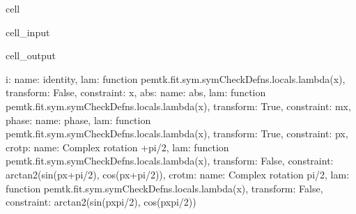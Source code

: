 \documentclass[letterpaper,table,10pt,english]{jupyterBook}
\begin{document}
\begin{sphinxuseclass}{cell}\begin{sphinxVerbatimInput}

\begin{sphinxuseclass}{cell_input}
\begin{sphinxVerbatim}[commandchars=\\\{\}]
   

\end{sphinxVerbatim}

\end{sphinxuseclass}\end{sphinxVerbatimInput}
\begin{sphinxVerbatimOutput}

\begin{sphinxuseclass}{cell_output}
\begin{sphinxVerbatim}[commandchars=\\\{\}]
\PYGZob{}\PYGZsq{}i\PYGZsq{}: \PYGZob{}\PYGZsq{}name\PYGZsq{}: \PYGZsq{}identity\PYGZsq{},
  \PYGZsq{}lam\PYGZsq{}: \PYGZlt{}function pemtk.fit.\PYGZus{}sym.symCheckDefns.\PYGZlt{}locals\PYGZgt{}.\PYGZlt{}lambda\PYGZgt{}(x)\PYGZgt{},
  \PYGZsq{}transform\PYGZsq{}: False,
  \PYGZsq{}constraint\PYGZsq{}: \PYGZsq{}x\PYGZsq{}\PYGZcb{},
 \PYGZsq{}abs\PYGZsq{}: \PYGZob{}\PYGZsq{}name\PYGZsq{}: \PYGZsq{}abs\PYGZsq{},
  \PYGZsq{}lam\PYGZsq{}: \PYGZlt{}function pemtk.fit.\PYGZus{}sym.symCheckDefns.\PYGZlt{}locals\PYGZgt{}.\PYGZlt{}lambda\PYGZgt{}(x)\PYGZgt{},
  \PYGZsq{}transform\PYGZsq{}: True,
  \PYGZsq{}constraint\PYGZsq{}: \PYGZsq{}m\PYGZus{}x\PYGZsq{}\PYGZcb{},
 \PYGZsq{}phase\PYGZsq{}: \PYGZob{}\PYGZsq{}name\PYGZsq{}: \PYGZsq{}phase\PYGZsq{},
  \PYGZsq{}lam\PYGZsq{}: \PYGZlt{}function pemtk.fit.\PYGZus{}sym.symCheckDefns.\PYGZlt{}locals\PYGZgt{}.\PYGZlt{}lambda\PYGZgt{}(x)\PYGZgt{},
  \PYGZsq{}transform\PYGZsq{}: True,
  \PYGZsq{}constraint\PYGZsq{}: \PYGZsq{}p\PYGZus{}x\PYGZsq{}\PYGZcb{},
 \PYGZsq{}crot\PYGZus{}p\PYGZsq{}: \PYGZob{}\PYGZsq{}name\PYGZsq{}: \PYGZsq{}Complex rotation +pi/2\PYGZsq{},
  \PYGZsq{}lam\PYGZsq{}: \PYGZlt{}function pemtk.fit.\PYGZus{}sym.symCheckDefns.\PYGZlt{}locals\PYGZgt{}.\PYGZlt{}lambda\PYGZgt{}(x)\PYGZgt{},
  \PYGZsq{}transform\PYGZsq{}: False,
  \PYGZsq{}constraint\PYGZsq{}: \PYGZsq{}arctan2(sin(p\PYGZus{}x+pi/2), cos(p\PYGZus{}x+pi/2))\PYGZsq{}\PYGZcb{},
 \PYGZsq{}crot\PYGZus{}m\PYGZsq{}: \PYGZob{}\PYGZsq{}name\PYGZsq{}: \PYGZsq{}Complex rotation \PYGZhy{}pi/2\PYGZsq{},
  \PYGZsq{}lam\PYGZsq{}: \PYGZlt{}function pemtk.fit.\PYGZus{}sym.symCheckDefns.\PYGZlt{}locals\PYGZgt{}.\PYGZlt{}lambda\PYGZgt{}(x)\PYGZgt{},
  \PYGZsq{}transform\PYGZsq{}: False,
  \PYGZsq{}constraint\PYGZsq{}: \PYGZsq{}arctan2(sin(p\PYGZus{}x\PYGZhy{}pi/2), cos(p\PYGZus{}x\PYGZhy{}pi/2))\PYGZsq{}\PYGZcb{}\PYGZcb{}
\end{sphinxVerbatim}


\end{sphinxuseclass}
\end{sphinxVerbatimOutput}
\end{sphinxuseclass}
\end{document}
